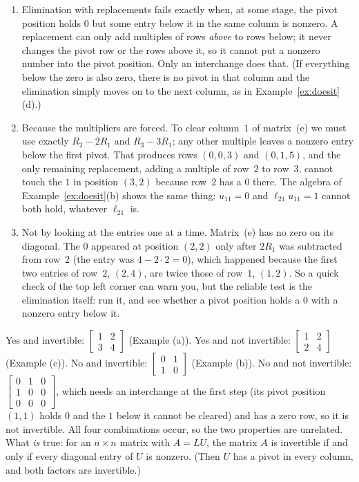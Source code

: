 \documentclass[11pt]{article}
\begin{document}
\begin{description}[leftmargin=0pt,itemsep=5pt]
  \item[Pause and think \ref{think:fails}.]
        \begin{enumerate}[label=(\alph*),nosep,leftmargin=*]
          \item Elimination with replacements fails exactly when, at some stage, the pivot position holds $0$ but some entry below it in the same column is nonzero. A replacement can only add multiples of rows \emph{above} to rows below; it never changes the pivot row or the rows above it, so it cannot put a nonzero number into the pivot position. Only an interchange does that. (If everything below the zero is also zero, there is no pivot in that column and the elimination simply moves on to the next column, as in Example~\ref{ex:doesit}(d).)
          \item Because the multipliers are forced. To clear column~$1$ of matrix~(e) we must use exactly $R_2-2R_1$ and $R_3-3R_1$; any other multiple leaves a nonzero entry below the first pivot. That produces rows $(0,0,3)$ and $(0,1,5)$, and the only remaining replacement, adding a multiple of row~$2$ to row~$3$, cannot touch the $1$ in position $(3,2)$ because row~$2$ has a $0$ there. The algebra of Example~\ref{ex:doesit}(b) shows the same thing: $u_{11}=0$ and $\ell_{21}u_{11}=1$ cannot both hold, whatever $\ell_{21}$ is.
          \item Not by looking at the entries one at a time. Matrix~(e) has no zero on its diagonal. The $0$ appeared at position $(2,2)$ only after $2R_1$ was subtracted from row~$2$ (the entry was $4-2\cdot2=0$), which happened because the first two entries of row~$2$, $(2,4)$, are twice those of row~$1$, $(1,2)$. So a quick check of the top left corner can warn you, but the reliable test is the elimination itself: run it, and see whether a pivot position holds a $0$ with a nonzero entry below it.
        \end{enumerate}
  \item[Pause and think \ref{think:invertible}.] Yes and invertible: $\begin{bmatrix}1&2\\3&4\end{bmatrix}$ (Example (a)). Yes and not invertible: $\begin{bmatrix}1&2\\2&4\end{bmatrix}$ (Example (c)). No and invertible: $\begin{bmatrix}0&1\\1&0\end{bmatrix}$ (Example (b)). No and not invertible: $\begin{bmatrix}0&1&0\\1&0&0\\0&0&0\end{bmatrix}$, which needs an interchange at the first step (its pivot position $(1,1)$ holds $0$ and the $1$ below it cannot be cleared) and has a zero row, so it is not invertible. All four combinations occur, so the two properties are unrelated. What \emph{is} true: for an $n\times n$ matrix with $A=LU$, the matrix $A$ is invertible if and only if every diagonal entry of $U$ is nonzero. (Then $U$ has a pivot in every column, and both factors are invertible.)

\end{description}
\end{document}
